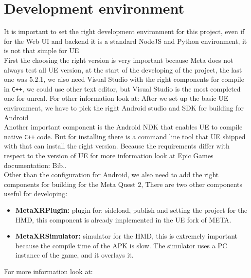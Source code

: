 \section{Development environment}
\noindent
It is important to set the right development environment for this project, even if for the Web \ac{UI} and backend it is a standard NodeJS and Python environment, 
it is not that simple for \ac{UE}\\
First the choosing the right version is very important because Meta does not always test all \ac{UE} version, at the start of the developing of the project, the last one was 5.2.1,
we also need Visual Studio with the right components for compile in \texttt{C++}, we could use other text editor, but Visual Studio is the most completed one for unreal.
For other information look at: \cite{UEvisualStudio}
After we set up the basic \ac{UE} environment, we have to pick the right Android studio and \ac{SDK} for building for Android \\
Another important component is the Android \ac{NDK} that enables \ac{UE} to compile native \texttt{C++} code.
But for installing there is a command line tool that \ac{UE} shipped with that can install the right version. 
Because the requirements differ with respect to the version of \ac{UE} for more information look at Epic Games documentation: Bib.\cite{UEandroid}.\\
Other than the configuration for Android, we also need to add the right components for building for the Meta Quest 2,
There are two other components useful for developing:
\begin{itemize}
  \item \textbf{MetaXRPlugin:} plugin for: sideload, publish and setting the project for the \ac{HMD}, this component is already implemented in the \ac{UE} fork of META.
  \item \textbf{MetaXRSimulator:} simulator for the \ac{HMD}, this is extremely important because the compile time of the \ac{APK} is slow. The simulator uses a PC instance of the game, and it overlays it.
\end{itemize}
\noindent
For more information look at: \cite{MetaSetup}

